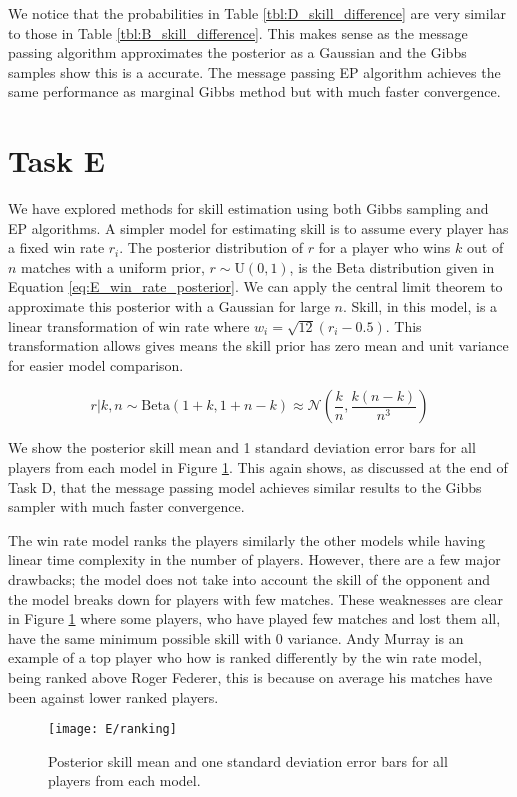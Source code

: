 \documentclass[11pt]{article}
\begin{document}
We notice that the probabilities in Table \ref{tbl:D_skill_difference} are very similar to those in Table \ref{tbl:B_skill_difference}. This makes sense as the message passing algorithm approximates the posterior as a Gaussian and the Gibbs samples show this is a accurate. The message passing EP algorithm achieves the same performance as marginal Gibbs method but with much faster convergence.

\section{Task E}

We have explored methods for skill estimation using both Gibbs sampling and EP algorithms. A simpler model for estimating skill is to assume every player has a fixed win rate $r_i$. The posterior distribution of $r$ for a player who wins $k$ out of $n$ matches with a uniform prior, $r \sim \text{U}(0,1)$, is the Beta distribution given in Equation \ref{eq:E_win_rate_posterior}. We can apply the central limit theorem to approximate this posterior with a Gaussian for large $n$. Skill, in this model, is a linear transformation of win rate where $w_i = \sqrt{12}(r_i - 0.5)$. This transformation allows gives means the skill prior has zero mean and unit variance for easier model comparison.

\begin{equation}
    r|k,n \sim \text{Beta}(1+k, 1+n-k) \approx \mathcal{N}(\frac{k}{n}, \frac{k(n-k)}{n^3})
    \label{eq:E_win_rate_posterior}
\end{equation}

We show the posterior skill mean and 1 standard deviation error bars for all players from each model in Figure \ref{fig:E_ranking}. This again shows, as discussed at the end of Task D, that the message passing model achieves similar results to the Gibbs sampler with much faster convergence. 

The win rate model ranks the players similarly the other models while having linear time complexity in the number of players. However, there are a few major drawbacks; the model does not take into account the skill of the opponent and the model breaks down for players with few matches. These weaknesses are clear in Figure \ref{fig:E_ranking} where some players, who have played few matches and lost them all, have the same minimum possible skill with 0 variance. Andy Murray is an example of a top player who how is ranked differently by the win rate model, being ranked above Roger Federer, this is because on average his matches have been against lower ranked players. 

\begin{figure}
    \centering
    \texttt{[image: E/ranking]}
    \caption{Posterior skill mean and one standard deviation error bars for all players from each model.}
    \label{fig:E_ranking}
\end{figure}
\end{document}
